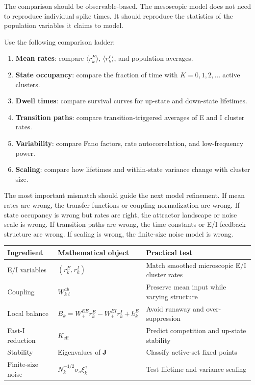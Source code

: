 The comparison should be observable-based. The mesoscopic model does not need to reproduce individual spike times. It should reproduce the statistics of the population variables it claims to model.

Use the following comparison ladder:
%
\begin{enumerate}[leftmargin=*]
  \item \textbf{Mean rates}: compare $\langle r_k^E\rangle$, $\langle r_k^I\rangle$, and population averages.
  \item \textbf{State occupancy}: compare the fraction of time with $K=0,1,2,\ldots$ active clusters.
  \item \textbf{Dwell times}: compare survival curves for up-state and down-state lifetimes.
  \item \textbf{Transition paths}: compare transition-triggered averages of E and I cluster rates.
  \item \textbf{Variability}: compare Fano factors, rate autocorrelation, and low-frequency power.
  \item \textbf{Scaling}: compare how lifetimes and within-state variance change with cluster size.
\end{enumerate}

The most important mismatch should guide the next model refinement. If mean rates are wrong, the transfer functions or coupling normalization are wrong. If state occupancy is wrong but rates are right, the attractor landscape or noise scale is wrong. If transition paths are wrong, the time constants or E/I feedback structure are wrong. If scaling is wrong, the finite-size noise model is wrong.

\begin{chaptersummary}

\begin{center}
\renewcommand{\arraystretch}{1.45}
\begin{tabularx}{\textwidth}{@{}l X X@{}}
  \toprule
  \textbf{Ingredient} & \textbf{Mathematical object} & \textbf{Practical test} \\
  \midrule
  E/I variables & $(r_k^E,r_k^I)$ & Match smoothed microscopic E/I cluster rates \\
  Coupling & $W^{ab}_{k\ell}$ & Preserve mean input while varying structure \\
  Local balance & $B_k=W_{+}^{EE}r_k^E-W_{+}^{EI}r_k^I+h_k^E$ & Avoid runaway and over-suppression \\
  Fast-I reduction & $K_{\mathrm{eff}}$ & Predict competition and up-state stability \\
  Stability & Eigenvalues of $\mathbf{J}$ & Classify active-set fixed points \\
  Finite-size noise & $N_k^{-1/2}\sigma_a\xi_k^a$ & Test lifetime and variance scaling \\
  \bottomrule
\end{tabularx}
\end{center}

\end{chaptersummary}


